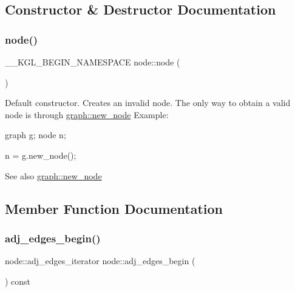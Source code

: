 \subsection{Constructor \& Destructor Documentation}
\mbox{\label{classnode_ad603259398d5667e3b97a6322a2bcc20}} 
\subsubsection{\texorpdfstring{node()}{node()}}
{\footnotesize\ttfamily \+\_\+\+\_\+\+K\+G\+L\+\_\+\+B\+E\+G\+I\+N\+\_\+\+N\+A\+M\+E\+S\+P\+A\+CE node\+::node (\begin{DoxyParamCaption}{ }\end{DoxyParamCaption})}

Default constructor. Creates an invalid node. The only way to obtain a valid node is through \mbox{\hyperlink{classgraph_ab9505335c20558319b6cce25aed23524}{graph\+::new\+\_\+node}} Example\+: 
\begin{DoxyPre}
  graph g;
  node n;\end{DoxyPre}



\begin{DoxyPre}  n = g.new\_node();
\end{DoxyPre}


\begin{DoxySeeAlso}{See also}
\mbox{\hyperlink{classgraph_ab9505335c20558319b6cce25aed23524}{graph\+::new\+\_\+node}} 
\end{DoxySeeAlso}


\subsection{Member Function Documentation}
\mbox{\label{classnode_a788d3e932a5c164caa5ec82aa47551b2}} 
\subsubsection{\texorpdfstring{adj\+\_\+edges\+\_\+begin()}{adj\_edges\_begin()}}
{\footnotesize\ttfamily node\+::adj\+\_\+edges\+\_\+iterator node\+::adj\+\_\+edges\+\_\+begin (\begin{DoxyParamCaption}{ }\end{DoxyParamCaption}) const}

